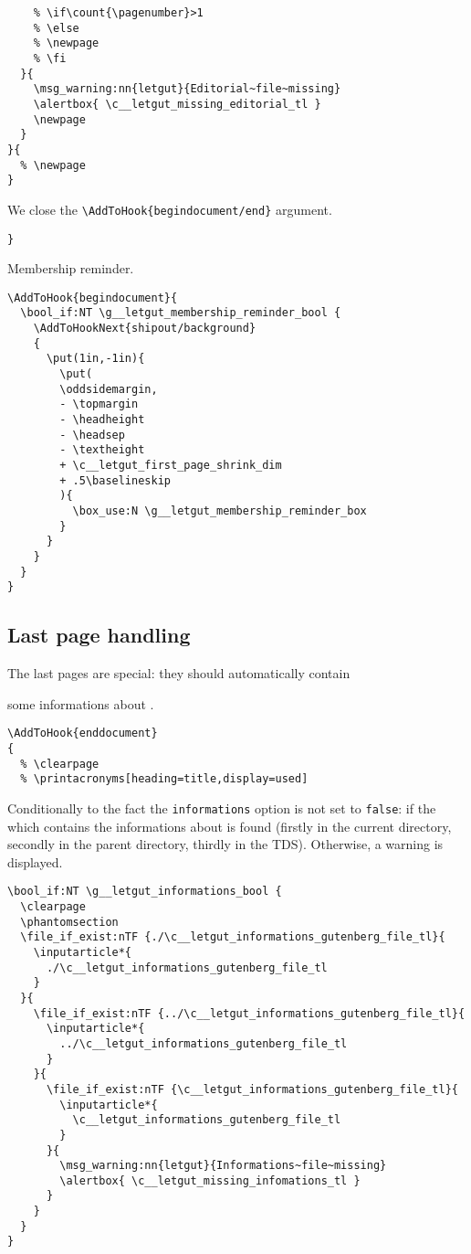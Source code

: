 \documentclass{letgut}
\begin{document}
\begin{lstlisting}
    % \if\count{\pagenumber}>1
    % \else
    % \newpage
    % \fi
  }{
    \msg_warning:nn{letgut}{Editorial~file~missing}
    \alertbox{ \c__letgut_missing_editorial_tl }
    \newpage
  }
}{
  % \newpage
}
\end{lstlisting}

We close the \lstinline+\AddToHook{begindocument/end}+ argument.

\begin{lstlisting}
}
\end{lstlisting}

Membership reminder.

\begin{lstlisting}
\AddToHook{begindocument}{
  \bool_if:NT \g__letgut_membership_reminder_bool {
    \AddToHookNext{shipout/background}
    {
      \put(1in,-1in){
        \put(
        \oddsidemargin,
        - \topmargin
        - \headheight
        - \headsep
        - \textheight
        + \c__letgut_first_page_shrink_dim
        + .5\baselineskip
        ){
          \box_use:N \g__letgut_membership_reminder_box
        }
      }
    }
  }
}
\end{lstlisting}

\subsection{Last page handling}
\label{ImplementationLastpagehandling-jbng55h0jlj0}
The last pages are special: they should automatically contain

some informations about \gutenberg.

\begin{lstlisting}
\AddToHook{enddocument}
{
  % \clearpage
  % \printacronyms[heading=title,display=used]
\end{lstlisting}
Conditionally to the fact the \lstinline+informations+ option is not set to \lstinline+false+: if
the  which contains the informations about
\gutenberg{} is found (firstly in the current directory, secondly in the parent
directory, thirdly in the TDS). Otherwise, a warning is displayed.
\begin{lstlisting}
\bool_if:NT \g__letgut_informations_bool {
  \clearpage
  \phantomsection
  \file_if_exist:nTF {./\c__letgut_informations_gutenberg_file_tl}{
    \inputarticle*{
      ./\c__letgut_informations_gutenberg_file_tl
    }
  }{
    \file_if_exist:nTF {../\c__letgut_informations_gutenberg_file_tl}{
      \inputarticle*{
        ../\c__letgut_informations_gutenberg_file_tl
      }
    }{
      \file_if_exist:nTF {\c__letgut_informations_gutenberg_file_tl}{
        \inputarticle*{
          \c__letgut_informations_gutenberg_file_tl
        }
      }{
        \msg_warning:nn{letgut}{Informations~file~missing}
        \alertbox{ \c__letgut_missing_infomations_tl }
      }
    }
  }
}
\end{lstlisting}
\end{document}
